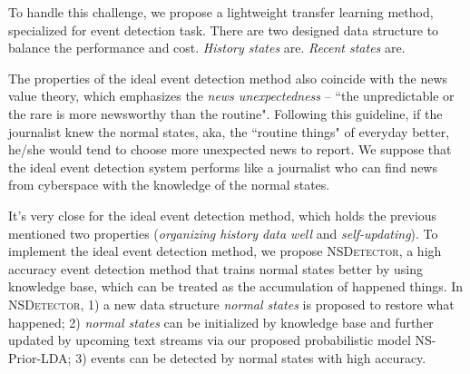 \documentclass{article}
\begin{document}
To handle this challenge, we propose a lightweight transfer learning method, specialized for event detection task. 
There are two designed data structure to balance the performance and cost.  
\textit{History states} are. 
\textit{Recent states} are.

The properties of the ideal event detection method also coincide with the news value theory\cite{galtung1965structure}\cite{caple2013delving}, which emphasizes the \textit{news unexpectedness} -- ``the unpredictable or the rare is more newsworthy than the routine"\cite{bell1991language}.
Following this guideline, if the journalist knew the normal states, aka, the ``routine things" of everyday better, he/she would tend to choose more unexpected news to report. 
We suppose that the ideal event detection system performs like a journalist who can find news from cyberspace with the knowledge of the normal states. 

It's very close for the ideal event detection method, which holds the previous mentioned two properties (\textit{organizing history data well} and \textit{self-updating}). To implement the ideal event detection method, we propose \textsc{NSDetector}, a high accuracy event detection method that trains normal states better by using knowledge base, which can be treated as the accumulation of happened things. 
In \textsc{NSDetector}, 1) a new data structure \textit{normal states} is proposed to restore what happened; 2) \textit{normal states} can be initialized by knowledge base and further updated by upcoming text streams via our proposed probabilistic model NS-Prior-LDA; 3) events can be detected by normal states with high accuracy.
\end{document}
